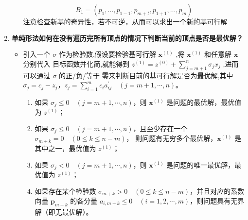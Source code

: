 \begin{enumerate}
\begin{itemize}
    \[
    B_1 = \left( p_1, \ldots, p_{1-1}, p_{m+t}, p_{1+1}, \ldots, p_m \right)
    \]
    注意检查新基的奇异性，若不可逆，从而可以求出一个新的基可行解
        \end{itemize}
		\item \textbf{单纯形法如何在没有遍历完所有顶点的情况下判断当前的顶点是否是最优解？} 
		\begin{itemize}
			\item 引入一个 \( \sigma \) 作为检验数,假设要检验基可行解 \( {\mathbf{x}}^{\left( 1\right) } \) ,将 \( {\mathbf{x}}^{\left( 1\right) } \) 和任意解 \( \mathbf{x} \) 分别代入
目标函数并化简,就能得到 \( {z}^{\left( 1\right) } = {z}^{\left( 0\right) } + \mathop{\sum }\limits_{{j = m + 1}}^{n}{\sigma }_{j}{x}_{j} \) ,进而可以通过 \( \sigma \) 的正/负/等于
零来判断目前的基可行解是否为最优解,其中\( \sigma_j = c_j - z_j \)，\( z_j = \sum_{i=1}^{m} c_i a_{ij}^{\prime} \quad (j = m+1, \cdots, n) \)。
			\begin{enumerate}
			\item 如果 \( \sigma_j \leq 0 \quad (j = m+1, \cdots, n) \)，则 \( \mathbf{x}^{(1)} \) 是问题的最优解，最优值为 \( z^{(1)} \)；
            \item 如果 \( \sigma_j \leq 0 \quad (j = m+1, \cdots, n) \)，且至少存在一个 \( \sigma_{m+k} = 0 \quad (0 \leq k \leq n-m) \)，
            则问题有无穷多个最优解，\( \mathbf{x}^{(1)} \) 是其中之一，最优值为 \( z^{(1)} \)；
            \item 如果 \( \sigma_j < 0 \quad (j = m+1, \cdots, n) \)，则 \( \mathbf{x}^{(1)} \) 是问题的唯一最优解，最优值为 \( z^{(1)} \)；
            \item 如果存在某个检验数 \( \sigma_{m+k} > 0 \quad (0 \leq k \leq n-m) \)，并且对应的系数向量 \( \mathbf{p}_{m+k} \) 的各分量
            \( a_{i, m+k} \leq 0 \quad (i = 1, 2, \cdots, m) \)，则问题具有无界解（即无最优解）。
        	\end{enumerate}
		\end{itemize}
	\end{enumerate}
	
